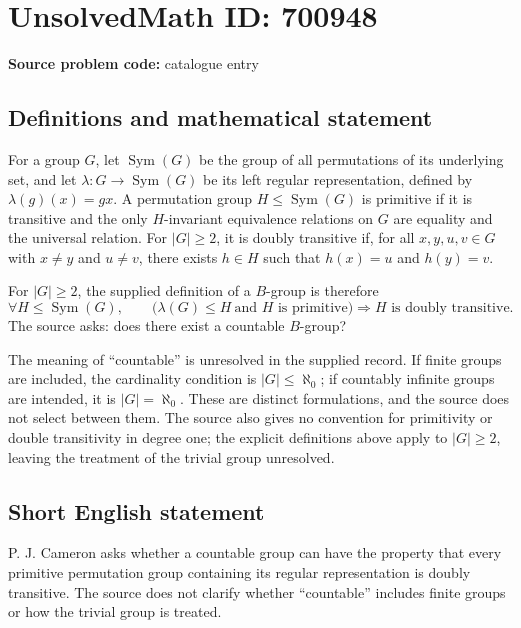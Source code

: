 \documentclass[11pt]{article}
\begin{document}
\section*{UnsolvedMath ID: 700948}
\textbf{Source problem code:} catalogue entry
\subsection{Definitions and mathematical statement}
For a group \(G\), let \(\operatorname{Sym}(G)\) be the group of all permutations of its underlying set, and let \(\lambda:G\to\operatorname{Sym}(G)\) be its left regular representation, defined by \(\lambda(g)(x)=gx\). A permutation group \(H\leq\operatorname{Sym}(G)\) is primitive if it is transitive and the only \(H\)-invariant equivalence relations on \(G\) are equality and the universal relation. For \(|G|\geq2\), it is doubly transitive if, for all \(x,y,u,v\in G\) with \(x\ne y\) and \(u\ne v\), there exists \(h\in H\) such that \(h(x)=u\) and \(h(y)=v\).

For \(|G|\geq2\), the supplied definition of a \(B\)-group is therefore
\[
\forall H\leq\operatorname{Sym}(G),\qquad
\bigl(\lambda(G)\leq H\ \text{and }H\text{ is primitive}\bigr)
\Longrightarrow H\text{ is doubly transitive}.
\]
The source asks: does there exist a countable \(B\)-group?

The meaning of ``countable'' is unresolved in the supplied record. If finite groups are included, the cardinality condition is \(|G|\leq\aleph_0\); if countably infinite groups are intended, it is \(|G|=\aleph_0\). These are distinct formulations, and the source does not select between them. The source also gives no convention for primitivity or double transitivity in degree one; the explicit definitions above apply to \(|G|\geq2\), leaving the treatment of the trivial group unresolved.
\subsection{Short English statement}
P. J. Cameron asks whether a countable group can have the property that every primitive permutation group containing its regular representation is doubly transitive. The source does not clarify whether ``countable'' includes finite groups or how the trivial group is treated.
\end{document}

